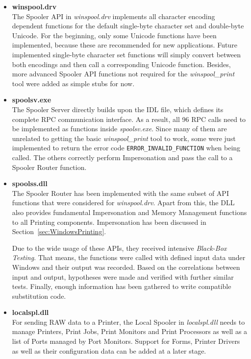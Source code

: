 \begin{itemize}
	\item \textbf{winspool.drv} \\
				The Spooler \gls{API} in \emph{winspool.drv} implements all character encoding dependent functions for the default single-byte character set and double-byte Unicode.
				For the beginning, only some Unicode functions have been implemented, because these are recommended for new applications.
				Future implemented single-byte character set functions will simply convert between both encodings and then call a corresponding Unicode function.
				Besides, more advanced Spooler \gls{API} functions not required for the \emph{winspool\_print} tool were added as simple stubs for now.
	
	\item \textbf{spoolsv.exe} \\
				The Spooler Server directly builds upon the \gls{IDL} file, which defines its complete \gls{RPC} communication interface.
				As a result, all 96 \gls{RPC} calls need to be implemented as functions inside \emph{spoolsv.exe}.
				Since many of them are unrelated to getting the basic \emph{winspool\_print} tool to work, some were just implemented to return the error code \texttt{ERROR\_INVALID\_FUNCTION} when being called.
				The others correctly perform Impersonation and pass the call to a Spooler Router function.
				
	\item \textbf{spoolss.dll} \\
				The Spooler Router has been implemented with the same subset of \gls{API} functions that were considered for \emph{winspool.drv}.
				Apart from this, the \gls{DLL} also provides fundamental Impersonation and Memory Management functions to all Printing components.
				Impersonation has been discussed in Section~\ref{sec:WindowsPrinting}.
				
				Due to the wide usage of these \glspl{API}, they received intensive \emph{Black-Box Testing}.
				That means, the functions were called with defined input data under Windows and their output was recorded.
				Based on the correlations between input and output, hypotheses were made and verified with further similar tests.
				Finally, enough information has been gathered to write compatible substitution code.
	
	\item \textbf{localspl.dll} \\
				For sending RAW data to a Printer, the Local Spooler in \emph{localspl.dll} needs to manage Printers, Print Jobs, Print Monitors and Print Processors as well as a list of Ports managed by Port Monitors.
				Support for Forms, Printer Drivers as well as their configuration data can be added at a later stage.
				

\end{itemize}
